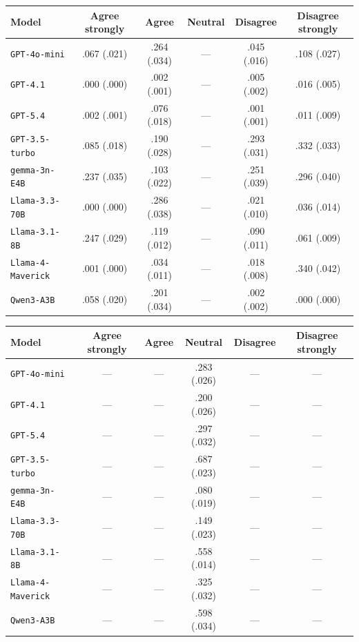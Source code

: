 \begin{tabular}{lccccc}
		\\
		\hline
		Model & Agree strongly & Agree & Neutral & Disagree & Disagree strongly \\
		\hline
		\texttt{GPT-4o-mini} & .067 (.021) & .264 (.034) & --- & .045 (.016) & .108 (.027) \\
		\texttt{GPT-4.1} & .000 (.000) & .002 (.001) & --- & .005 (.002) & .016 (.005) \\
		\texttt{GPT-5.4} & .002 (.001) & .076 (.018) & --- & .001 (.001) & .011 (.009) \\
		\texttt{GPT-3.5-turbo} & .085 (.018) & .190 (.028) & --- & .293 (.031) & .332 (.033) \\
		\texttt{gemma-3n-E4B} & .237 (.035) & .103 (.022) & --- & .251 (.039) & .296 (.040) \\
		\texttt{Llama-3.3-70B} & .000 (.000) & .286 (.038) & --- & .021 (.010) & .036 (.014) \\
		\texttt{Llama-3.1-8B} & .247 (.029) & .119 (.012) & --- & .090 (.011) & .061 (.009) \\
		\texttt{Llama-4-Maverick} & .001 (.000) & .034 (.011) & --- & .018 (.008) & .340 (.042) \\
		\texttt{Qwen3-A3B} & .058 (.020) & .201 (.034) & --- & .002 (.002) & .000 (.000) \\
		\hline
\end{tabular}


\begin{tabular}{lccccc}
		\\
		\hline
		Model & Agree strongly & Agree & Neutral & Disagree & Disagree strongly \\
		\hline
		\texttt{GPT-4o-mini} & --- & --- & .283 (.026) & --- & --- \\
		\texttt{GPT-4.1} & --- & --- & .200 (.026) & --- & --- \\
		\texttt{GPT-5.4} & --- & --- & .297 (.032) & --- & --- \\
		\texttt{GPT-3.5-turbo} & --- & --- & .687 (.023) & --- & --- \\
		\texttt{gemma-3n-E4B} & --- & --- & .080 (.019) & --- & --- \\
		\texttt{Llama-3.3-70B} & --- & --- & .149 (.023) & --- & --- \\
		\texttt{Llama-3.1-8B} & --- & --- & .558 (.014) & --- & --- \\
		\texttt{Llama-4-Maverick} & --- & --- & .325 (.032) & --- & --- \\
		\texttt{Qwen3-A3B} & --- & --- & .598 (.034) & --- & --- \\
		\hline
\end{tabular}

